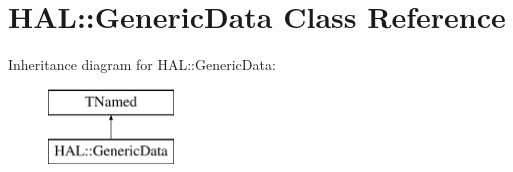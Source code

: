 \hypertarget{class_h_a_l_1_1_generic_data}{\section{H\+A\+L\+:\+:Generic\+Data Class Reference}
\label{class_h_a_l_1_1_generic_data}
}
Inheritance diagram for H\+A\+L\+:\+:Generic\+Data\+:\begin{figure}[H]
\begin{center}
\leavevmode
\includegraphics[height=2.000000cm]{class_h_a_l_1_1_generic_data}
\end{center}
\end{figure}
